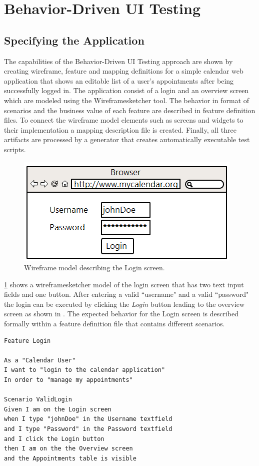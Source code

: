 \documentclass{sig-alternate-05-2015}
\begin{document}
\section{Behavior-Driven UI Testing}\label{sec:BehaviorDrivenUITesting}
\subsection{Specifying the Application}\label{sec:SpecifyingTheApplication} 
The capabilities of the Behavior-Driven UI Testing approach are shown by creating wireframe, feature and mapping definitions for a simple calendar web application that shows an editable list of a user's appointments after being successfully logged in.
The application consist of a login and an overview screen which are modeled using the Wireframesketcher tool.
The behavior in format of scenarios and the business value of each feature are described in feature definition files.
To connect the wireframe model elements such as screens and widgets to their implementation a mapping description file is created.
Finally, all three artifacts are processed by a generator that creates automatically executable test scripts.

\begin{figure}[h]
	\centering
	\includegraphics[width=0.8\linewidth]{Login.png}
	\caption{Wireframe model describing the Login screen.}
	\label{fig:login}
\end{figure}

\cref{fig:login} shows a wireframesketcher model of the login screen that has two text input fields and one button.
After entering a valid ``username" and a valid ``password" the login can be executed by clicking the \textit{Login} button leading to the overview screen as shown in .
The expected behavior for the Login screen is described formally within a feature definition file that contains different scenarios.

\begin{lstlisting}[captionpos=b, caption=Feature Description: Login Screen., label={lst:featureLogin}, language=dsl]
Feature Login

As a "Calendar User"
I want to "login to the calendar application"
In order to "manage my appointments"

Scenario ValidLogin
Given I am on the Login screen 
when I type "johnDoe" in the Username textfield 
and I type "Password" in the Password textfield 
and I click the Login button
then I am on the the Overview screen
and the Appointments table is visible
\end{lstlisting}
\end{document}
